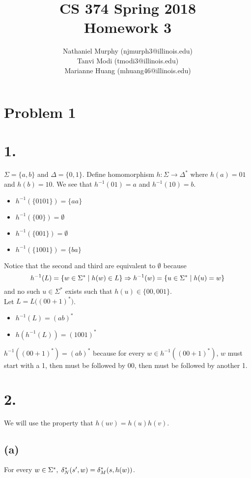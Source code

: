 \documentclass[11pt]{article}
\title{\textbf{CS 374 Spring 2018\\Homework 3}}
\author{Nathaniel Murphy (njmurph3@illinois.edu)\\
		Tanvi Modi (tmodi3@illinois.edu)\\
		Marianne Huang (mhuang46@illinois.edu)}
\date{}
\begin{document}
\maketitle

\section*{Problem 1}
\section*{1.}
$\Sigma=\{a,b\}$ and $\Delta=\{0,1\}$. Define homomorphism $h:\Sigma\rightarrow\Delta^*$ where $h(a)=01$ and $h(b)=10$. We see that $h^{-1}(01)=a$ and $h^{-1}(10)=b$.
\begin{itemize}
	\item $h^{-1}(\{0101\})=\{aa\}$
	\item $h^{-1}(\{00\})=\emptyset$
	\item $h^{-1}(\{001\})=\emptyset$
	\item $h^{-1}(\{1001\})=\{ba\}$
\end{itemize}
Notice that the second and third are equivalent to $\emptyset$ because
\[h^{-1}(L)=\{w\in\Sigma^*\hspace{1mm}|\hspace{1mm}h(w)\in L\}\Rightarrow h^{-1}(w)=\{u\in\Sigma^*\hspace{1mm}|\hspace{1mm}h(u)=w\}\]
and no such $u\in\Sigma^*$ exists such that $h(u)\in\{00,001\}$.
\\[15mm]
Let $L=L\big((00+1)^*\big)$.
\begin{itemize}
	\item $h^{-1}(L)=(ab)^*$
	\item $h(h^{-1}(L))=(1001)^*$
\end{itemize}
$h^{-1}((00+1)^*)=(ab)^*$ because for every $w\in h^{-1}((00+1)^*)$, $w$ must start with a 1, then must be followed by 00, then must be followed by another 1.
\clearpage
\section*{2.}
We will use the property that $h(uv)=h(u)h(v)$.
\subsection*{(a)}
For every $w\in\Sigma^*,\hspace{1mm}\delta^*_N(s',w)=\delta^*_M(s,h(w))$.
\end{document}
